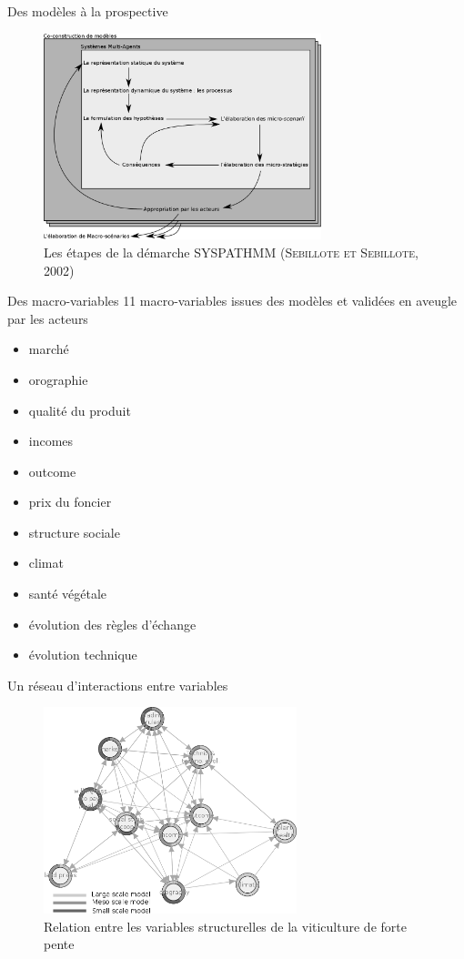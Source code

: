 \documentclass[newPxFont]{beamer}
\begin{document}
\begin{frame}[c]{Des modèles à la prospective}
  \vspace{-2em}
  \begin{figure}
   \includegraphics[height=6cm]{img/a_etapes_syspathmm.png}
   \caption{Les étapes de la démarche SYSPATHMM (\textsc{Sebillote et Sebillote,  2002})}
  \end{figure}
\end{frame}

\begin{frame}[c]{Des macro-variables}
  \vspace{-2em}
  11 macro-variables issues des modèles et validées en aveugle par les acteurs
  \begin{itemize}
    \item marché
    \item orographie
    \item qualité du produit
    \item incomes
    \item outcome
    \item prix du foncier
    \item structure sociale
    \item climat
    \item santé végétale
    \item évolution des règles d'échange
    \item évolution technique
  \end{itemize}
\end{frame}

\begin{frame}[c]{Un réseau d'interactions entre variables}
  \vspace{-2em}
  \begin{figure}
   \includegraphics[height=6cm]{img/a_igraph_variables_structurelle.png}
   \caption{Relation entre les variables structurelles de la viticulture de forte pente}
  \end{figure}
\end{frame}
\end{document}
